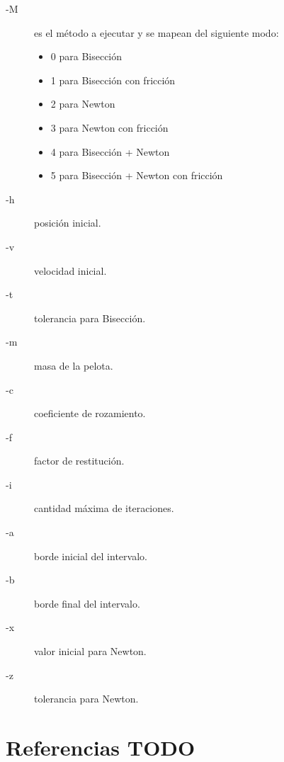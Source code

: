 \documentclass[a4paper]{article}
\begin{document}
\begin{description}
\item[-M] es el método a ejecutar y se mapean del siguiente modo:
\begin{itemize}
  \item 0 para Bisección
  \item 1 para Bisección con fricción
  \item 2 para Newton
  \item 3 para Newton con fricción
  \item 4 para Bisección + Newton
  \item 5 para Bisección + Newton con fricción
\end{itemize}
\item[-h] posición inicial.
\item[-v] velocidad inicial.
\item[-t] tolerancia para Bisección.
\item[-m] masa de la pelota.
\item[-c] coeficiente de rozamiento.
\item[-f] factor de restitución.
\item[-i] cantidad máxima de iteraciones.
\item[-a] borde inicial del intervalo.
\item[-b] borde final del intervalo.
\item[-x] valor inicial para Newton.
\item[-z] tolerancia para Newton.
\end{description}

\newpage

\section{Referencias TODO}
\end{document}
